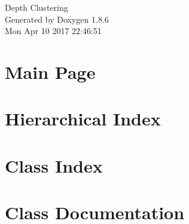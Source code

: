 \documentclass[twoside]{book}
\newcommand{\clearemptydoublepage}{%
  \newpage{\pagestyle{empty}\cleardoublepage}%
}
\begin{document}
\hypersetup{pageanchor=false}
\begin{titlepage}
\vspace*{7cm}
\begin{center}%
{\Large Depth Clustering }\\
\vspace*{1cm}
{\large Generated by Doxygen 1.8.6}\\
\vspace*{0.5cm}
{\small Mon Apr 10 2017 22:46:51}\\
\end{center}
\end{titlepage}
\clearemptydoublepage
\tableofcontents
\clearemptydoublepage
{}
\hypersetup{pageanchor=true}

\chapter{Main Page}
\label{index}\hypertarget{index}{}
\chapter{Hierarchical Index}

\chapter{Class Index}

\chapter{Class Documentation}






























\newpage
{}
{}
\printindex
\end{document}
